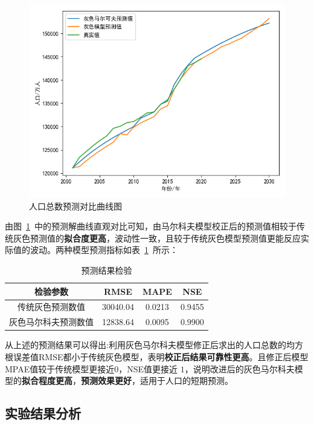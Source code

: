 \documentclass{whutmod}
\begin{document}
		\begin{figure}[H]
			\centering
			\includegraphics[width=.8\textwidth]{figures/ads.png}
			\caption{人口总数预测对比曲线图
			}\label{lcdadasdat}
		\end{figure}
	
	
	
	由图~\ref{lcdadasdat}~中的预测解曲线直观对比可知，由马尔科夫模型校正后的预测值相较于传统灰色预测值的\textbf{拟合度更高}，波动性一致，且较于传统灰色模型预测值更能反应实际值的波动。两种模型预测指标如表~\ref{jjj}~所示：
	
	\begin{table}[H]
		\centering\caption{预测结果检验}\label{jjj}
		\begin{tabular}{cccc}
			\toprule[1.5pt]
			\multicolumn{1}{m{6cm}}{\centering 检验参数}
			& \multicolumn{1}{m{2cm}}{\centering RMSE}
			& \multicolumn{1}{m{2cm}}{\centering MAPE}
			& \multicolumn{1}{m{2cm}}{\centering NSE}
			\\
			\midrule[0.5pt]	
			传统灰色预测数值 &   30040.04 &  0.0213 & 0.9455\\ 
			灰色马尔科夫预测数值&  12838.64  &  0.0095  &  0.9900 \\  
			\bottomrule[1.5pt]	
		\end{tabular}
	\end{table} 
	
	从上述的预测结果可以得出:利用灰色马尔科夫模型修正后求出的人口总数的均方根误差值RMSE都小于传统灰色模型，表明\textbf{校正后结果可靠性更高}。且修正后模型MPAE值较于传统模型更接近$0$，NSE值更接近 $1$，说明改进后的灰色马尔科夫模型的\textbf{拟合程度更高}，\textbf{预测效果更好}，适用于人口的短期预测。
	
		
        \subsection{实验结果分析}
  
\end{document}
